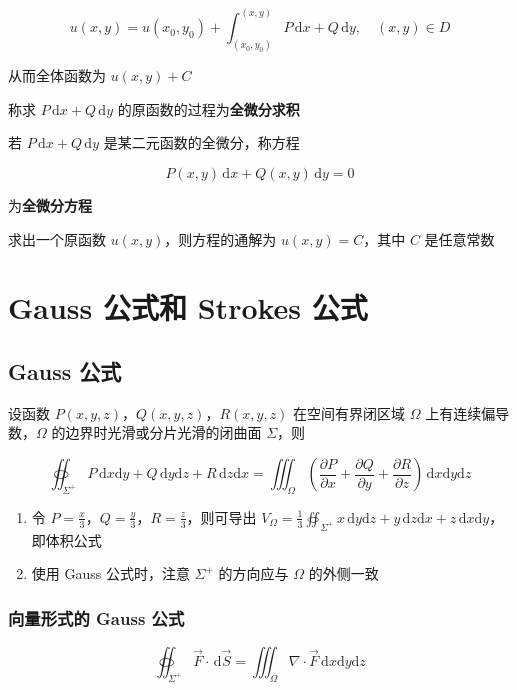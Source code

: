 \documentclass[lang = zh , final , oneside , openany , titlepage , zihao = -4 , linespread = 1.3 , baselineskip = false , cjk-font = windows , text-font = newtx , math-font = newtx , math-style = ISO , uppercase-greek = upright , integral-limits = false]{sjtureport}
\begin{document}
\[u(x,y) = u(x_0,y_0) + \int_{(x_0,y_0)}^{(x,y)} P\,\mathrm{d}x +Q\,\mathrm{d}y,\quad (x,y)\in D\]

从而全体函数为 \(u(x,y) + C\)

称求 \(P\,\mathrm{d}x +Q\,\mathrm{d}y\)
的原函数的过程为\textbf{全微分求积}

若 \(P\,\mathrm{d}x +Q\,\mathrm{d}y\) 是某二元函数的全微分，称方程

\[P(x,y)\,\mathrm{d}x +Q(x,y)\,\mathrm{d}y = 0\]

为\textbf{全微分方程}

求出一个原函数 \(u(x,y)\)，则方程的通解为 \(u(x,y) = C\)，其中 \(C\)
是任意常数

\section{Gauss 公式和 Strokes 公式}

\subsection{Gauss 公式}

\begin{theorem}
    设函数 \(P(x,y,z)\)，\(Q(x,y,z)\)，\(R(x,y,z)\) 在空间有界闭区域
\(\Omega\) 上有连续偏导数，\(\Omega\) 的边界时光滑或分片光滑的闭曲面
\(\Sigma\)，则

\[\oiint_{\Sigma^+} P\,\mathrm{d}x\mathrm{d}y + Q\,\mathrm{d}y\mathrm{d}z + R\,\mathrm{d}z\mathrm{d}x = \iiint_\Omega \left(\frac{\partial P}{\partial x} + \frac{\partial Q}{\partial y} + \frac{\partial R}{\partial z}\right)\,\mathrm{d}x\mathrm{d}y\mathrm{d}z\]
\end{theorem}

\begin{enumerate}
\item
  令 \(P=\frac{x}{3}\)，\(Q=\frac{y}{3}\)，\(R=\frac{z}{3}\)，则可导出
  \(\displaystyle V_\Omega = \frac{1}{3}\oiint_{\Sigma^+} x\,\mathrm{d}y\mathrm{d}z + y\,\mathrm{d}z\mathrm{d}x + z\,\mathrm{d}x\mathrm{d}y\)，即体积公式
\item
  使用 Gauss 公式时，注意 \(\Sigma^+\) 的方向应与 \(\Omega\) 的外侧一致
\end{enumerate}

\subsubsection{向量形式的 Gauss 公式}

\[\oiint_{\Sigma^+} \vec{F}\cdot\,\mathrm{d}\vec{S} = \iiint_\Omega \nabla\cdot\vec{F}\,\mathrm{d}x\mathrm{d}y\mathrm{d}z\]
\end{document}

